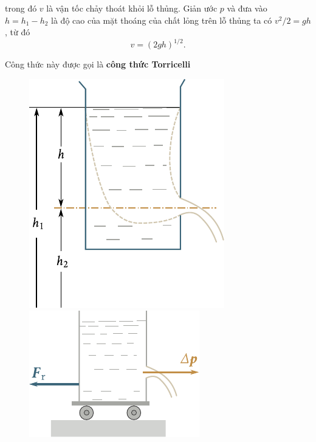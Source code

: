trong đó $v$ là vận tốc chảy thoát khỏi lỗ thủng. Giản ước $p$ và đưa vào $h=h_1-h_2$ là độ cao của mặt thoáng của chất lỏng trên lỗ thủng ta có $v^2/2=gh$, từ đó
\begin{equation}\label{eq:9_6}
	v = (2gh)^{1/2}.
\end{equation}

\noindent

Công thức này được gọi là \textbf{công thức Torricelli}

\begin{figure}[!htb]
	\begin{minipage}[t]{0.5\linewidth}
		\begin{center}
			\includegraphics[scale=1.0]{figures/ch_09/fig_9_7.pdf}
			\caption[]{}
			\label{fig:9_7}
		\end{center}
	\end{minipage}
	\hspace{-0.0cm}
	\begin{minipage}[t]{0.5\linewidth}
		\begin{center}
			\includegraphics[scale=1.0]{figures/ch_09/fig_9_8.pdf}
			\caption[]{}
			\label{fig:9_8}
		\end{center}
	\end{minipage}
	\vspace{-0.4cm}
\end{figure}

